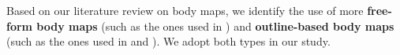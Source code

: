 

Based on our literature review on body maps, we identify the use of more \textbf{free-form body maps} (such as the ones used in \cite{gastaldo_body-map_2012}) and \textbf{outline-based body maps} (such as the ones used in \cite{windlin_soma_2019} and \cite{nummenmaa_bodily_2014}). We adopt both types in our study.

